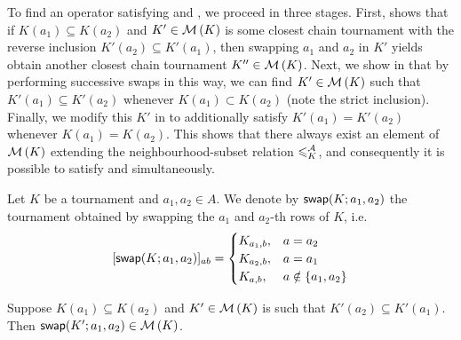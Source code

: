 To find an operator satisfying \chainmin{} and \mon{}, we
proceed in three stages. First,  shows
that if $K(a_1) \subseteq K(a_2)$ and $K' \in \operatorname{\mathcal{M}}\left({K}\right)$ is some closest chain
tournament with the reverse inclusion $K'(a_2) \subseteq K'(a_1)$, then
swapping $a_1$ and $a_2$ in $K'$ yields obtain another closest chain tournament
$K'' \in \operatorname{\mathcal{M}}\left({K}\right)$. Next, we show in
 that by performing
successive swaps in this way, we can find $K' \in \operatorname{\mathcal{M}}\left({K}\right)$ such that $K'(a_1)
\subseteq K'(a_2)$ whenever $K(a_1) \subset K(a_2)$ (note the strict
inclusion). Finally, we modify this $K'$ in
 to additionally satisfy $K'(a_1) =
K'(a_2)$ whenever $K(a_1) = K(a_2)$.  This shows that there always exist an
element of $\operatorname{\mathcal{M}}\left({K}\right)$ extending the neighbourhood-subset relation $\leqslant^{\mathcal{A}}_K$,
and consequently it is possible to satisfy \chainmin{} and
\mon{} simultaneously.

\begin{definition}
    Let $K$ be a tournament and $a_1, a_2 \in A$. We denote by
    $\mathsf{swap}({K}; {a_1}, {a_2})$ the tournament obtained by swapping the $a_1$ and
    $a_2$-th rows of $K$, i.e.
    \[
        [\mathsf{swap}({K}; {a_1}, {a_2})]_{ab} = \begin{cases}
            K_{a_1,b},& a = a_2 \\
            K_{a_2,b},& a = a_1 \\
            K_{a,b},& a \notin \{a_1,a_2\}
        \end{cases}
    \]
\end{definition}

\begin{lemma}
    \label{tourn_result_chainmin_mon_swapping}
    Suppose $K(a_1) \subseteq K(a_2)$ and $K' \in \operatorname{\mathcal{M}}\left({K}\right)$ is such that
    $K'(a_2) \subseteq K'(a_1)$. Then $\mathsf{swap}({K'}; {a_1}, {a_2}) \in \operatorname{\mathcal{M}}\left({K}\right)$.
\end{lemma}

\def\xset{(-1, 0) circle (1cm)}
\def\yset{(1, 0) circle (1cm)}
\def\xprimeset{(0, 1) circle (1cm)}
\def\yprimeset{(0, -1) circle (1cm)}
\newcommand{\setboundaries}{
    \draw \xset node {$X$};
    \draw \yset node {$Y$};
    \draw \xprimeset node {$X'$};
    \draw \yprimeset node {$Y'$};
}
\newcommand{\thiswithoutthose}[2]{
    \begin{scope}[even odd rule]
        \clip #2 (-2, -2) rectangle (2, 2);
        \fill[orange!60] #1;
    \end{scope}
}

